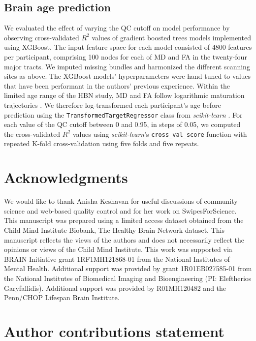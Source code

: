 \documentclass[fleqn,10pt,inline]{wlscirep}
\begin{document}
\subsection*{Brain age prediction}

We evaluated the effect of varying the QC cutoff on model performance by
observing cross-validated $R^2$ values of gradient boosted trees models
implemented using XGBoost. The input feature space for each model consisted of
\num{4800} features per participant, comprising 100 nodes for each of MD and FA in
the twenty-four major tracts. We imputed missing bundles and harmonized the
different scanning sites as above. The XGBoost models' hyperparameters were
hand-tuned to values that have been performant in the authors' previous
experience. Within the limited age range of the HBN study, MD and FA follow logarithmic maturation trajectories \cite{yeatman2014lifespan}. We therefore log-transformed each participant's age before prediction using the 
\texttt{TransformedTargetRegressor} class from \emph{scikit-learn} .
For each value
of the QC cutoff between 0 and 0.95, in steps of 0.05, we computed the
cross-validated $R^2$ values using \emph{scikit-learn}'s
\texttt{cross\_val\_score} function with repeated K-fold cross-validation using
five folds and five repeats.

\section*{Acknowledgments}

We would like to thank Anisha Keshavan for useful discussions of community
science and web-based quality control and for her work on SwipesForScience. This
manuscript was prepared using a limited access dataset obtained from the Child
Mind Institute Biobank, The Healthy Brain Network dataset. This manuscript
reflects the views of the authors and does not necessarily reflect the opinions
or views of the Child Mind Institute. This work was supported via BRAIN Initiative grant 1RF1MH121868-01 from the National Institutes of Mental Health. Additional support was provided by grant 1R01EB027585-01 from the National Institutes of Biomedical Imaging and Bioengineering (PI: Eleftherios Garyfallidis). Additional support was provided by R01MH120482 and the Penn/CHOP Lifespan Brain Institute. 

\section*{Author contributions statement}
\end{document}
